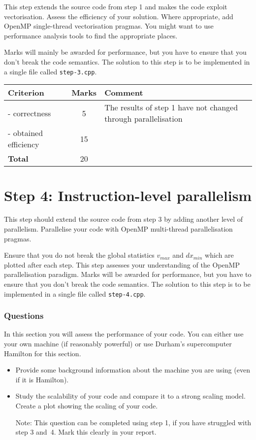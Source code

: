 \documentclass[11pt,a4paper,DIV=12,pdftex]{scrartcl}
\begin{document}
This step extends the source code from step 1 and makes the code exploit vectorisation. Assess the efficiency of your solution. Where appropriate, add OpenMP single-thread vectorisation pragmas. You might want to use performance analysis tools to find the appropriate places.

Marks will mainly be awarded for performance, but you have to ensure that you don’t break the code semantics. The solution to this step is to be implemented in a single file called \verb#step-3.cpp#.

\begin{table}[h]
\centering
 \begin{tabular}{|l|c|p{7cm}|}
 \hline
 \textbf{Criterion} & \textbf{Marks} &\textbf{Comment}\\
\hline
- correctness & 5 & The results of step 1 have not  changed through parallelisation\\
- obtained efficiency & 15 &\\
    \hline
\textbf{Total} & 20 & \\
 \hline
 \end{tabular}
\end{table}

\section*{Step 4: Instruction-level parallelism}

This step should extend the source code from step 3 by adding another level of parallelism. Parallelise your code with OpenMP multi-thread parallelisation pragmas.

Ensure that you do not break the global statistics $v_{max}$ and $dx_{min}$ which are plotted after each step. This step assesses your understanding of the OpenMP parallelisation paradigm.
Marks will be awarded for performance, but you have to ensure that you don’t break the code semantics. The solution to this step is to be implemented in a single file called \verb#step-4.cpp#.

\subsubsection*{Questions}
In this section you will assess the performance of your code. You can either use your own machine (if reasonably powerful) or use Durham’s supercomputer Hamilton for this section.

\begin{itemize}
\item Provide some background information about the machine you are using (even if it is Hamilton).

\item  Study the scalability of your code and compare it to a strong scaling model. Create a plot showing the scaling of your code.



Note: This question can be completed using step 1, if you have struggled with step 3 and~4. Mark this clearly in your report.
\end{itemize}
\end{document}
